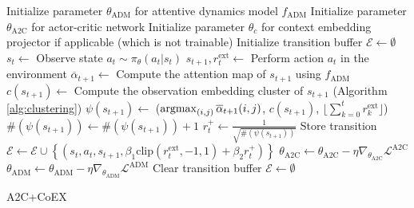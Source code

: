 \documentclass{article} \usepackage{iclr,times}
\newcommand{\argmax}{\operatornamewithlimits{argmax}}
\newcommand{\coex}{{CoEX}}
\begin{document}
{\begin{algorithm}
\begin{algorithmic}
\STATE Initialize parameter $\theta_\text{ADM}$ for attentive dynamics model $f_\text{ADM}$
\STATE Initialize parameter $\theta_\text{A2C}$ for actor-critic network
\STATE Initialize parameter $\theta_c$ for context embedding projector if applicable (which is not trainable)
\STATE Initialize transition buffer $\mathcal{E} \gets \emptyset$
		\STATE $s_t \gets $ Observe state
		\STATE $a_t \sim \pi_\theta(a_t|s_t)$
        \STATE $s_{t+1},r^\text{ext}_t \gets$ Perform action $a_t$ in the environment
\smallskip
        \STATE $\overline\alpha_{t+1} \leftarrow $ Compute the attention map of $s_{t+1}$ using $f_\text{ADM}$
        \STATE $c(s_{t+1}) \leftarrow$ Compute the observation embedding cluster of $s_{t+1}$ (Algorithm \ref{alg:clustering}) 
\smallskip
        \STATE $\psi(s_{t+1}) \gets$ ($\argmax_{(i,j)} \overline{\alpha}_{t+1}(i,j)$, $c(s_{t+1})$, $\lfloor \sum_{k=0}^t r_k^\text{ext} \rfloor$)
\STATE $\#(\psi(s_{t+1})) \gets \#(\psi(s_{t+1}))+1$
		\STATE $r^{+}_t \gets \frac{1}{\sqrt{\#(\psi(s_{t+1}))}}$
        \smallskip
        \STATE Store transition $\mathcal{E} \gets \mathcal{E} \cup \left\{(s_t, a_t, s_{t+1}, \beta_1 \mathrm{clip}(r_t^\text{ext}, -1, 1)+\beta_2 r^{+}_t)\right\}$
	\ENDFOR
    \STATE $\theta_\text{A2C} \gets \theta_\text{A2C} - \eta \nabla_{\theta_\text{A2C}} \mathcal{L}^\text{A2C}$
    \STATE $\theta_\text{ADM} \gets \theta_\text{ADM} - \eta \nabla_{\theta_\text{ADM}} \mathcal{L}^\text{ADM}$
\STATE Clear transition buffer $\mathcal{E} \gets \emptyset$
\ENDFOR
\end{algorithmic}
\caption{A2C+\coex{}}\label{alg:exp}
\end{algorithm}

}
\end{document}
